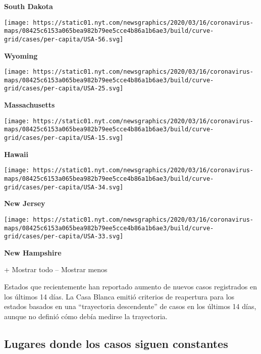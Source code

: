 \textbf{South Dakota}

\href{https://www.nytimes.com/interactive/2020/us/wyoming-coronavirus-cases.html}{}

\texttt{[image: https://static01.nyt.com/newsgraphics/2020/03/16/coronavirus-maps/08425c6153a065bea982b79ee5cce4b86a1b6ae3/build/curve-grid/cases/per-capita/USA-56.svg]}

\textbf{Wyoming}

\href{https://www.nytimes.com/interactive/2020/us/massachusetts-coronavirus-cases.html}{}

\texttt{[image: https://static01.nyt.com/newsgraphics/2020/03/16/coronavirus-maps/08425c6153a065bea982b79ee5cce4b86a1b6ae3/build/curve-grid/cases/per-capita/USA-25.svg]}

\textbf{Massachusetts}

\href{https://www.nytimes.com/interactive/2020/us/hawaii-coronavirus-cases.html}{}

\texttt{[image: https://static01.nyt.com/newsgraphics/2020/03/16/coronavirus-maps/08425c6153a065bea982b79ee5cce4b86a1b6ae3/build/curve-grid/cases/per-capita/USA-15.svg]}

\textbf{Hawaii}

\href{https://www.nytimes.com/interactive/2020/us/new-jersey-coronavirus-cases.html}{}

\texttt{[image: https://static01.nyt.com/newsgraphics/2020/03/16/coronavirus-maps/08425c6153a065bea982b79ee5cce4b86a1b6ae3/build/curve-grid/cases/per-capita/USA-34.svg]}

\textbf{New Jersey}

\href{https://www.nytimes.com/interactive/2020/us/new-hampshire-coronavirus-cases.html}{}

\texttt{[image: https://static01.nyt.com/newsgraphics/2020/03/16/coronavirus-maps/08425c6153a065bea982b79ee5cce4b86a1b6ae3/build/curve-grid/cases/per-capita/USA-33.svg]}

\textbf{New Hampshire}

+ Mostrar todo -- Mostrar menos

Estados que recientemente han reportado aumento de nuevos casos
registrados en los últimos 14 días. La Casa Blanca emitió criterios de
reapertura para los estados basados en una ``trayectoria descendente''
de casos en los últimos 14 días, aunque no definió cómo debía medirse la
trayectoria.

\hypertarget{lugares-donde-los-casos-siguen-constantes}{%
\subsection{Lugares donde los casos siguen
constantes}\label{lugares-donde-los-casos-siguen-constantes}}

